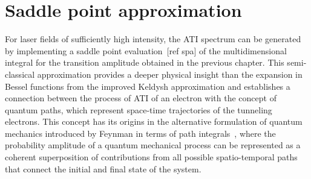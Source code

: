 \chapter{Saddle point approximation}
\label{cha:sp_approx}



For laser fields of sufficiently high intensity, the ATI spectrum can
be generated by implementing a saddle point evaluation~[ref spa] of
the multidimensional integral for the transition amplitude obtained in
the previous chapter. This semi-classical approximation provides a
deeper physical insight than the expansion in Bessel functions from
the improved Keldysh approximation and establishes a connection
between the process of ATI of an electron with the concept of quantum
paths, which represent space-time trajectories of the tunneling
electrons. This concept has its origins in the alternative formulation
of quantum mechanics introduced by Feynman in terms of path
integrals~\cite{RevModPhysFeynman}, where the probability amplitude of
a quantum mechanical process can be represented as a coherent
superposition of contributions from all possible spatio-temporal paths
that connect the initial and final state of the system.


